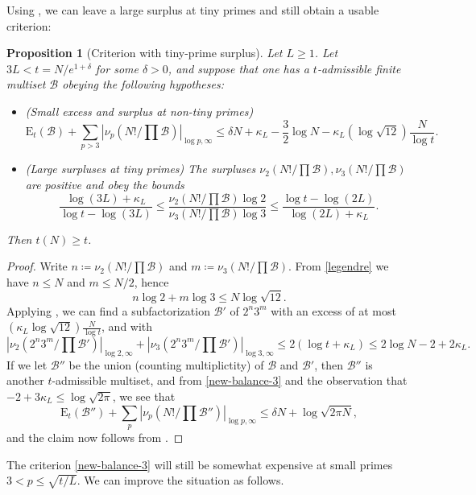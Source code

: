 \documentclass[12pt,a4paper,reqno]{amsart}
\numberwithin{equation}{section}
\theoremstyle{plain}
\newtheorem{proposition}[theorem]{Proposition}
\theoremstyle{definition}
\newcommand\tuple{{\mathcal B}}
\newcommand\excess{{\mathrm{E}}}
\begin{document}
Using , we can leave a large surplus at tiny primes and still obtain a usable criterion:

\begin{proposition}[Criterion with tiny-prime surplus]\label{balance-23}  Let $L \geq 1$.
  Let $3L < t = N/e^{1+\delta}$ for some $\delta>0$, and suppose that one has a $t$-admissible finite multiset $\tuple$ obeying the following hypotheses:
\begin{itemize}
  \item[(i)] (Small excess and surplus at non-tiny primes)
  \begin{equation}\label{new-balance-3}
    \excess_t(\tuple) + \sum_{p>3} |\nu_p(N!/\prod \tuple)|_{\log p,\infty} \leq \delta N + \kappa_L - \frac{3}{2} \log N - \kappa_L (\log \sqrt{12}) \frac{N}{\log t}.
  \end{equation}
  \item[(ii)] (Large surpluses at tiny primes)
The surpluses $\nu_2(N!/\prod \tuple), \nu_3(N!/\prod \tuple)$ are positive and obey the bounds
$$
\frac{\log(3L)+\kappa_L}{\log t - \log(3L)} \leq \frac{\nu_2(N!/\prod \tuple) \log 2}{\nu_3(N!/\prod \tuple) \log 3} \leq \frac{\log t - \log(2L)}{\log(2L)+\kappa_L}.
$$
\end{itemize}
Then $t(N) \geq t$.
\end{proposition}
  

\begin{proof} Write $n \coloneqq \nu_2(N!/\prod \tuple)$ and $m \coloneqq \nu_3(N!/\prod \tuple)$.  From \eqref{legendre} we have $n \leq N$ and $m \leq N/2$, hence
  $$ n \log 2 + m \log 3 \leq N \log \sqrt{12}.$$
Applying , we can find a subfactorization $\tuple'$ of $2^n 3^m$ with an excess of at most $(\kappa_L \log \sqrt{12}) \frac{N}{\log t}$, and with
$$ |\nu_2(2^n 3^m/\prod \tuple')|_{\log 2,\infty}
+ |\nu_3(2^n 3^m/\prod \tuple')|_{\log 3,\infty}
 \leq 2(\log t + \kappa_L) \leq 2 \log N - 2 + 2 \kappa_L.$$
 If we let $\tuple''$ be the union (counting multiplictity) of $\tuple$ and $\tuple'$, then $\tuple''$ is another $t$-admissible multiset, and from \eqref{new-balance-3} and the observation that $-2+3\kappa_L \leq \log \sqrt{2\pi}$, we see that
 $$
 \excess_t(\tuple'') + \sum_{p} |\nu_p(N!/\prod \tuple'')|_{\log p,\infty} \leq \delta N + \log \sqrt{2\pi N},$$
 and the claim now follows from .
\end{proof}

The criterion \eqref{new-balance-3} will still be somewhat expensive at small primes $3 < p \leq \sqrt{t/L}$.  We can improve the situation as follows.
\end{document}
